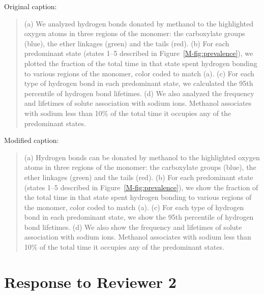 \documentclass{article}
\begin{document}
\begin{enumerate}[label={Comment \theenumi :}, leftmargin=3.9\parindent]
    Original caption:
    \begin{quote}
    (a) We analyzed hydrogen bonds donated by methanol to the highlighted oxygen
    atoms in three regions of the monomer: the carboxylate groups (blue), the ether linkages
    (green) and the tails (red). (b) For each predominant state (states 1--5 described in 
    Figure~\ref{M-fig:prevalence}), we plotted the fraction of the total time in that state 
    spent hydrogen bonding to various regions of the monomer, color coded to match (a).
    (c) For each type of hydrogen bond in each predominant state, we calculated the 95th percentile
    of hydrogen bond lifetimes. (d) We also analyzed the frequency and lifetimes of solute 
    association with sodium ions. Methanol associates with sodium less than 10\% of the total 
    time it occupies any of the predominant states.
    \end{quote}    
    
    Modified caption:
    \begin{quote}
    (a) Hydrogen bonds can be donated by methanol to the highlighted oxygen atoms in three 
    regions of the monomer: the carboxylate groups (blue), the ether linkages (green) and the
    tails (red). (b) For each predominant state (states 1--5 described in Figure~\ref{M-fig:prevalence}),
    we show the fraction of the total time in that state spent hydrogen bonding to various regions
    of the monomer, color coded to match (a). (c) For each type of hydrogen bond in each predominant
    state, we show the 95th percentile of hydrogen bond lifetimes. (d) We also show the 
    frequency and lifetimes of solute association with sodium ions. Methanol associates with sodium
    less than 10\% of the total time it occupies any of the predominant states.    
    \end{quote}

\end{enumerate}


\section*{Response to Reviewer 2}
\end{document}
